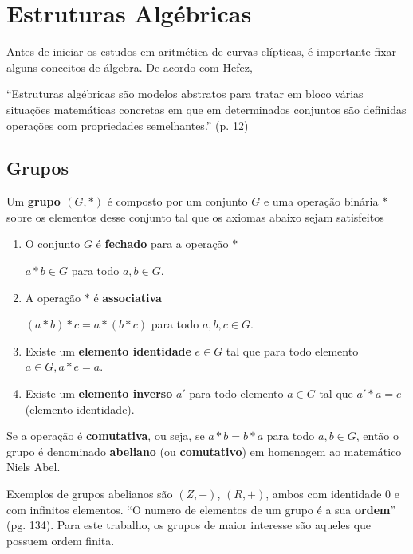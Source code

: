 %
%
\section{Estruturas Algébricas}

Antes de iniciar os estudos em aritmética de curvas elípticas, é importante
fixar alguns conceitos de álgebra. De acordo com Hefez,

\begin{citacao}
``Estruturas algébricas são modelos abstratos para tratar em bloco várias situações matemáticas concretas em que em determinados conjuntos são definidas operações com propriedades semelhantes.'' \cite{Hefez:2008} (p. 12)
\end{citacao}

%
%
\subsection{Grupos}

Um \textbf{grupo \((G,*)\)} é composto por um conjunto \(G\) e uma operação binária \(*\) sobre os elementos desse conjunto tal que os axiomas abaixo sejam satisfeitos \cite{Gilbert:2004}

\begin{enumerate}
\item O conjunto \(G\) é \textbf{fechado} para a operação \(*\)

$a * b \in G$ para todo $a,b \in G$.

\item A operação $*$ é \textbf{associativa}

$(a * b) * c = a * (b * c)$ para todo $a,b,c \in G$.

\item Existe um \textbf{elemento identidade} $e \in G$ tal que para todo elemento $a \in G, a * e = a$.
\item Existe um \textbf{elemento inverso} \(a'\) para todo elemento $a \in G$ tal que $a' * a = e$ (elemento identidade).
\end{enumerate}

Se a operação é \textbf{comutativa}, ou seja, se $a * b = b * a$ para todo $a, b \in G$, então o grupo é denominado \textbf{abeliano} (ou \textbf{comutativo}) em homenagem ao matemático Niels Abel. \cite{Gilbert:2004}

Exemplos de grupos abelianos são $(Z, +)$, $(R, +)$, ambos com identidade 0 e com infinitos elementos. ``O numero de elementos de um grupo é a sua \textbf{ordem}'' \cite{Coutinho:2014} (pg. 134). Para este trabalho, os grupos de maior interesse são aqueles que possuem ordem finita.

